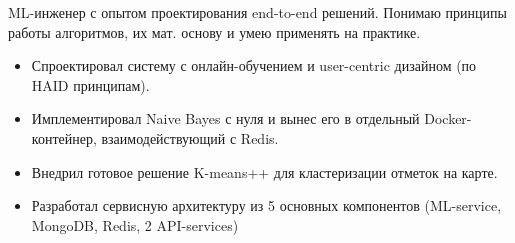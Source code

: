 \documentclass[10pt,a4paper,ragged2e]{altacv}
\begin{document}

\begin{fullwidth}
\makecvheader
\end{fullwidth}


ML-инженер с опытом проектирования end-to-end решений. Понимаю принципы работы алгоритмов, их мат. основу и умею применять на практике.

{\Large{}}
\begin{itemize}\large
    \item Спроектировал систему с онлайн-обучением и user-centric дизайном (по HAID принципам).
    \item Имплементировал Naive Bayes с нуля и вынес его в отдельный Docker-контейнер, взаимодействующий с Redis.
    \item Внедрил готовое решение K-means++ для кластеризации отметок на карте.
    \item Разработал сервисную архитектуру из 5 основных компонентов (ML-service, MongoDB, Redis, 2 API-services) 
\end{itemize}

\smallskip
\divider
\smallskip
\end{document}
